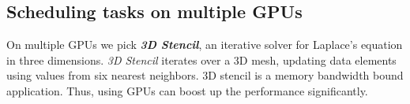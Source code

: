 %
\subsection{Scheduling tasks on multiple GPUs}
\label{subsec:3DStencil_1node}
On multiple GPUs we pick {\em \bf 3D Stencil}, an iterative solver for Laplace's equation in three dimensions.
{\em 3D Stencil} iterates over a 3D mesh, updating data elements using values from six nearest neighbors.
3D stencil is a memory bandwidth bound application. 
Thus, using GPUs can boost up the performance significantly.


